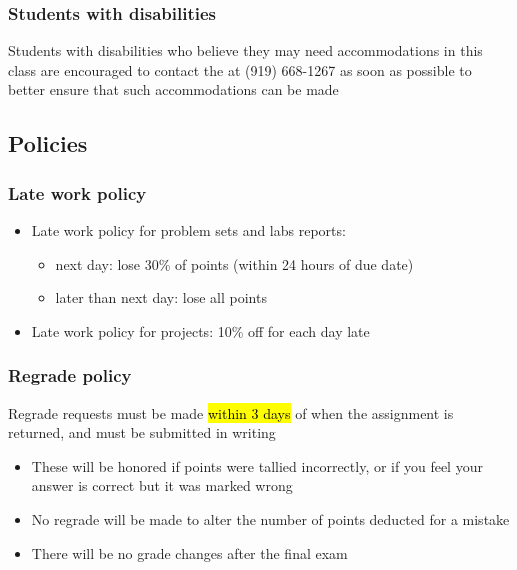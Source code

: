 \documentclass[11pt,containsverbatim,handout,xcolor=xelatex,dvipsnames,table]{beamer}
\begin{document}

\begin{frame}
\frametitle{Students with disabilities}

Students with disabilities who believe they may need accommodations in this class are encouraged to contact the  at (919) 668-1267 as soon as possible to better ensure that such accommodations can be made

\vfill


\end{frame}


\subsection{Policies}


\begin{frame}
\frametitle{Late work policy}

\begin{itemize}

\item Late work policy for problem sets and labs reports:
\begin{itemize}
\item next day: lose 30\% of points (within 24 hours of due date)
\item later than next day: lose all points
\end{itemize}

\item Late work policy for projects: 10\% off for each day late

\end{itemize}

\end{frame}


\begin{frame}
\frametitle{Regrade policy}

Regrade requests must be made \hl{within 3 days} of when the assignment is returned, and must be submitted in writing 

\begin{itemize}

\item These will be honored if points were tallied incorrectly, or if you feel your answer is correct but it was marked wrong

\item No regrade will be made to alter the number of points deducted for a mistake

\item There will be no grade changes after the final exam

\end{itemize}

\end{frame}
\end{document}
